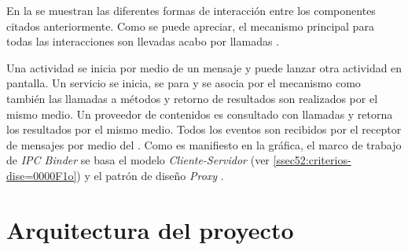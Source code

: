 En la  se muestran las diferentes formas
de interacción entre los componentes  citados anteriormente.
Como se puede apreciar, el mecanismo principal para todas las interacciones
son llevadas acabo por llamadas . 

Una actividad se inicia por medio de un mensaje y puede lanzar otra
actividad en pantalla. Un servicio se inicia, se para y se asocia
por el mecanismo  como también las llamadas a métodos y
retorno de resultados son realizados por el mismo medio. Un proveedor
de contenidos es consultado con llamadas  y retorna los
resultados por el mismo medio. Todos los eventos son recibidos por
el receptor de mensajes por medio del . Como es manifiesto
en la gráfica, el marco de trabajo de \emph{IPC Binder} se basa el
modelo \emph{Cliente-Servidor} (ver \ref{ssec52:criterios-dise=0000F1o})
y el patrón de diseño \emph{Proxy} \cite{Shalloway2004}.

\section{Arquitectura del proyecto}

